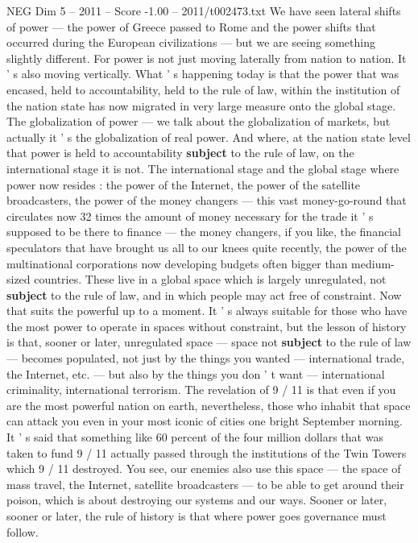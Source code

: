 \begin{textsample}{NEG Dim 5 – 2011 – Score -1.00 – 2011/t002473.txt}
We have seen lateral shifts of power — the power of Greece passed to Rome and the power shifts that occurred during the European civilizations — but we are seeing something slightly different.
For power is not just moving laterally from nation to nation.
It ' s also moving vertically.
What ' s happening today is that the power that was encased, held to accountability, held to the rule of law, within the institution of the nation state has now migrated in very large measure onto the global stage.
The globalization of power — we talk about the globalization of markets, but actually it ' s the globalization of real power.
And where, at the nation state level that power is held to accountability \textbf{subject} to the rule of law, on the international stage it is not.
The international stage and the global stage where power now resides : the power of the Internet, the power of the satellite broadcasters, the power of the money changers — this vast money-go-round that circulates now 32 times the amount of money necessary for the trade it ' s supposed to be there to finance — the money changers, if you like, the financial speculators that have brought us all to our knees quite recently, the power of the multinational corporations now developing budgets often bigger than medium-sized countries.
These live in a global space which is largely unregulated, not \textbf{subject} to the rule of law, and in which people may act free of constraint.
Now that suits the powerful up to a moment.
It ' s always suitable for those who have the most power to operate in spaces without constraint, but the lesson of history is that, sooner or later, unregulated space — space not \textbf{subject} to the rule of law — becomes populated, not just by the things you wanted — international trade, the Internet, etc. — but also by the things you don ' t want — international criminality, international terrorism.
The revelation of 9 / 11 is that even if you are the most powerful nation on earth, nevertheless, those who inhabit that space can attack you even in your most iconic of cities one bright September morning.
It ' s said that something like 60 percent of the four million dollars that was taken to fund 9 / 11 actually passed through the institutions of the Twin Towers which 9 / 11 destroyed.
You see, our enemies also use this space — the space of mass travel, the Internet, satellite broadcasters — to be able to get around their poison, which is about destroying our systems and our ways.
Sooner or later, sooner or later, the rule of history is that where power goes governance must follow.

\end{textsample}
